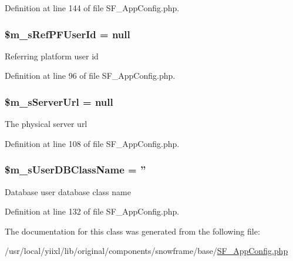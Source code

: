 Definition at line 144 of file SF\_\-AppConfig.php.

\hypertarget{classSF__AppConfig_ae91a01f7cb3d6446617f9e6cae69533c}{
\subsubsection[{\$m\_\-sRefPFUserId}]{\setlength{\rightskip}{0pt plus 5cm}\$m\_\-sRefPFUserId = null}}
\label{classSF__AppConfig_ae91a01f7cb3d6446617f9e6cae69533c}
Referring platform user id 

Definition at line 96 of file SF\_\-AppConfig.php.

\hypertarget{classSF__AppConfig_af011645fea7e741d5cffcbe968799d90}{
\subsubsection[{\$m\_\-sServerUrl}]{\setlength{\rightskip}{0pt plus 5cm}\$m\_\-sServerUrl = null}}
\label{classSF__AppConfig_af011645fea7e741d5cffcbe968799d90}
The physical server url 

Definition at line 108 of file SF\_\-AppConfig.php.

\hypertarget{classSF__AppConfig_a37cc028a41988ea3a5233fd132e189d9}{
\subsubsection[{\$m\_\-sUserDBClassName}]{\setlength{\rightskip}{0pt plus 5cm}\$m\_\-sUserDBClassName = ''}}
\label{classSF__AppConfig_a37cc028a41988ea3a5233fd132e189d9}
Database user database class name 

Definition at line 132 of file SF\_\-AppConfig.php.



The documentation for this class was generated from the following file:\begin{DoxyCompactItemize}
\item 
/usr/local/yiixl/lib/original/components/snowframe/base/\hyperlink{SF__AppConfig_8php}{SF\_\-AppConfig.php}\end{DoxyCompactItemize}
